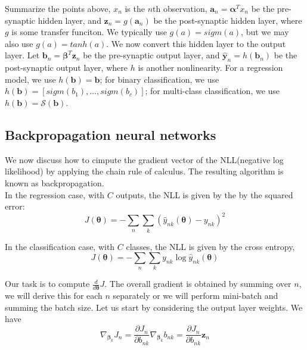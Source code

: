 \documentclass[12pt,a4paper]{article}%
\theoremstyle{definition}
\theoremstyle{plain}
\numberwithin{equation}{section}
\begin{document}
Summarize the points above, $x_{n}$ is the $n$th observation, $\mathbf{a}_{n} = \boldsymbol{\alpha}^{T} x_{n}$ be the pre-synaptic hidden layer, and $\mathbf{z}_{n} = g( \mathbf{a}_{n})$ be the post-synaptic
hidden layer, where $g$ is some transfer funciton. We typically use $g(a)=sigm(a)$, but we may also use $g(a)=tanh(a)$. We now convert this hidden layer to the output layer. Let $\mathbf{b}_{n} = \boldsymbol{\beta}^{T} \mathbf{z}_{n}$ be the pre-synaptic output layer, and $\hat{\mathbf{y}}_{n}=h(\mathbf{b}_{n})$ be the post-synaptic output layer, where $h$ is another nonlinearity. 
For a regression model, we use $h(\mathbf{b})= \mathbf{b}$; for binary classification, we use $h(\mathbf{b})= [sigm(b_{1}),\dots,sigm(b_{c})]$; for multi-class classification, we use $h(\mathbf{b})= \mathcal{S}(\mathbf{b})$.


\subsection{Backpropagation neural networks}
We now discuss how to cimpute the gradient vector of the NLL(negative log likelihood) by applying the chain rule of calculus. The resulting algorithm is known as backpropagation.~\\

In the regression case, with $C$ outputs, the NLL is given by the by the squared error:
\begin{equation}
J(\boldsymbol{\theta}) = -\sum\limits_{n}\sum\limits_{k}(\hat{y}_{nk}(\boldsymbol{\theta})-y_{nk})^{2}
\end{equation}

In the classification case, with $C$ classes, the NLL is given by the cross entropy,
\begin{equation}
J(\boldsymbol{\theta}) = -\sum\limits_{n}\sum\limits_{k} y_{nk} \log \hat{y}_{nk}(\boldsymbol{\theta}) 
\end{equation}

Our task is to compute $\frac{d}{d\boldsymbol{\theta}}J$. The overall gradient is obtained by summing over $n$, we will derive this for each $n$ separately or we will perform mini-batch and summing the batch size.
Let us start by considering the output layer weights. We have
\begin{equation}
\nabla_{\boldsymbol{\beta}_{k}} J_{n} = \frac{\partial J_{n}}{\partial b_{nk}} \nabla_{\boldsymbol{\beta}_{k}} b_{nk} = \frac{\partial J_{n}}{\partial b_{nk}} \mathbf{z}_{n}
\end{equation}
\end{document}
